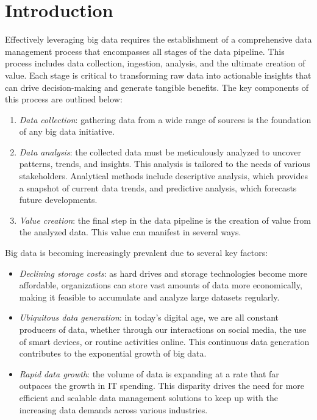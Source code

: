 \section{Introduction}

Effectively leveraging big data requires the establishment of a comprehensive data management process that encompasses all stages of the data pipeline. 
This process includes data collection, ingestion, analysis, and the ultimate creation of value. 
Each stage is critical to transforming raw data into actionable insights that can drive decision-making and generate tangible benefits. 
The key components of this process are outlined below:
\begin{enumerate}
    \item \textit{Data collection}: gathering data from a wide range of sources is the foundation of any big data initiative. 
    \item \textit{Data analysis}: the collected data must be meticulously analyzed to uncover patterns, trends, and insights. 
        This analysis is tailored to the needs of various stakeholders.
        Analytical methods include descriptive analysis, which provides a snapshot of current data trends, and predictive analysis, which forecasts future developments.
    \item \textit{Value creation}: the final step in the data pipeline is the creation of value from the analyzed data. 
        This value can manifest in several ways.
\end{enumerate} 
Big data is becoming increasingly prevalent due to several key factors:
\begin{itemize}
    \item \textit{Declining storage costs}: as hard drives and storage technologies become more affordable, organizations can store vast amounts of data more economically, making it feasible to accumulate and analyze large datasets regularly.
    \item \textit{Ubiquitous data generation}: in today's digital age, we are all constant producers of data, whether through our interactions on social media, the use of smart devices, or routine activities online. 
        This continuous data generation contributes to the exponential growth of big data.
    \item \textit{Rapid data growth}: the volume of data is expanding at a rate that far outpaces the growth in IT spending. 
        This disparity drives the need for more efficient and scalable data management solutions to keep up with the increasing data demands across various industries.
\end{itemize}
